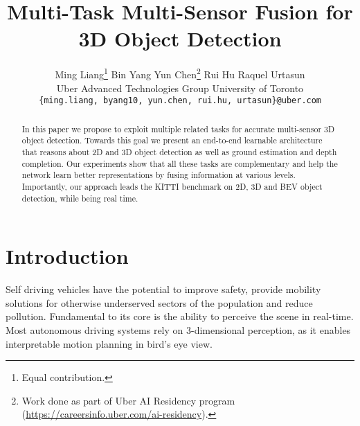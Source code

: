 \documentclass[10pt,twocolumn,letterpaper]{article}
\begin{document}
\title{Multi-Task Multi-Sensor Fusion for 3D Object Detection}

\author{
  Ming Liang\thanks{Equal contribution.} \quad Bin Yang \quad Yun Chen\thanks{Work done as part of Uber AI Residency program (\url{https://careersinfo.uber.com/ai-residency}).} \quad Rui Hu \quad Raquel Urtasun\\
  Uber Advanced Technologies Group \quad University of Toronto\\
  \small\texttt{\{ming.liang, byang10, yun.chen, rui.hu, urtasun\}@uber.com}
}

\maketitle


\begin{abstract}

In this paper we propose to exploit multiple related tasks for accurate  multi-sensor 3D object detection. Towards this goal we present an end-to-end learnable architecture that reasons about 2D and 3D object detection as well as ground estimation and depth completion. 
Our experiments show that all these tasks are complementary  and help the network learn better representations by fusing information at various levels. 
Importantly, our approach leads the KITTI benchmark on 2D, 3D and BEV object detection, while being real time.  

\end{abstract} \section{Introduction}

Self driving vehicles have the potential to  improve safety, provide mobility solutions for otherwise underserved sectors of the population and reduce pollution.  Fundamental to its core is the ability to perceive the scene in real-time. Most autonomous driving systems rely on 3-dimensional perception, as it enables interpretable motion planning in bird's eye view.   
\end{document}
